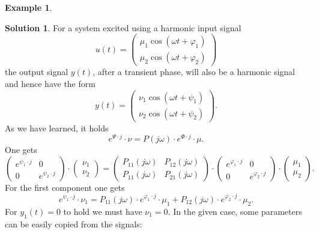 \documentclass[a4paper,12 pt]{article}
\numberwithin{equation}{section}
\theoremstyle{definition}
\newtheorem{bsp}{Example}
\theoremstyle{remark}
\theoremstyle{definition}
\newtheorem*{lsg}{Solution}
\theoremstyle{definition}
\theoremstyle{definition}
\theoremstyle{remark}
\begin{document}
\begin{bsp}
\newpage
\begin{lsg}
For a system excited using a harmonic input signal
\begin{equation*}
u(t)=\begin{pmatrix}
\mu_1\cos(\omega t + \varphi_1)\\
\mu_2\cos(\omega t + \varphi_2)
\end{pmatrix}
\end{equation*}
the output signal $y(t)$, after a transient phase, will also be a harmonic signal and hence have the form
\begin{equation*}
y(t)=\begin{pmatrix}
\nu_1\cos(\omega t + \psi_1)\\
\nu_2\cos(\omega t + \psi_2)
\end{pmatrix}.
\end{equation*}
As we have learned, it holds
\begin{equation*}
e^{\Psi \cdot j}\cdot \nu =P(j\omega)\cdot e^{\Phi \cdot j}\cdot \mu.
\end{equation*}
One gets
\begin{equation*}
\begin{pmatrix}
e^{\psi_1 \cdot j}&0\\ 0&e^{\psi_2 \cdot j} \end{pmatrix}\cdot \begin{pmatrix}\nu_1 \\ \nu_2\end{pmatrix}=\begin{pmatrix} P_{11}(j\omega)&P_{12}(j\omega)\\ P_{11}(j\omega)& P_{21}(j\omega) \end{pmatrix} \cdot \begin{pmatrix} e^{\varphi_1 \cdot j}&0 \\ 0& e^{\varphi_2 \cdot j}\end{pmatrix} \cdot \begin{pmatrix} \mu_1 \\ \mu_2 \end{pmatrix}.
\end{equation*}
For the first component one gets
\begin{equation*}
e^{\psi_1 \cdot j}\cdot \nu_1 = P_{11}(j\omega) \cdot e^{\varphi_1 \cdot j}\cdot \mu_1 + P_{12}(j\omega) \cdot e^{\varphi_2 \cdot j}\cdot \mu_2.
\end{equation*}
For $y_1(t)=0$ to hold we must have $\nu_1=0$. In the given case, some parameters can be easily copied from the signals:
\begin{equation*}

\end{equation*}
\end{lsg}
\end{bsp}
\end{document}
